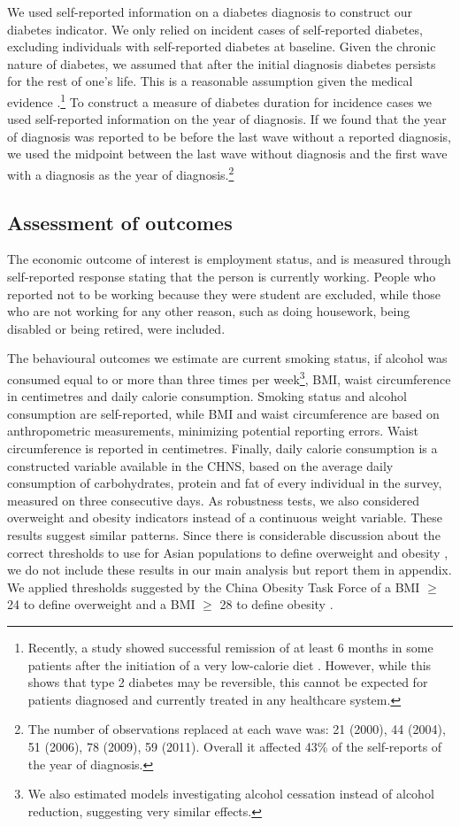 We used self-reported information on a diabetes diagnosis to construct our diabetes indicator. We only relied on incident cases of self-reported diabetes, excluding individuals with self-reported diabetes at baseline. Given the chronic nature of diabetes, we assumed that after the initial diagnosis diabetes persists for the rest of one's life. This is a reasonable assumption given the medical evidence \parencite{Steven2016}.\footnote{Recently, a study showed successful remission of at least 6 months in some patients after the initiation of a very low-calorie diet \parencite{Steven2016}. However, while this shows that type 2 diabetes may be reversible, this cannot be expected for patients diagnosed and currently treated in any healthcare system.} To construct a measure of diabetes duration for incidence cases we used self-reported information on the year of diagnosis. If we found that the year of diagnosis was reported to be before the last wave without a reported diagnosis, we used the midpoint between the last wave without diagnosis and the first wave with a diagnosis as the year of diagnosis.\footnote{The number of observations replaced at each wave was: 21 (2000), 44 (2004), 51  (2006), 78 (2009), 59 (2011). Overall it affected 43\% of the self-reports of the year of diagnosis.}

\subsection{Assessment of outcomes}

The economic outcome of interest is employment status, and is measured through self-reported response stating that the person is currently working. People who reported not to be working because they were student are excluded, while those who are not working for any other reason, such as doing housework, being disabled or being retired, were included. 

The behavioural outcomes we estimate are current smoking status, if alcohol was consumed equal to or more than three times per week\footnote{We also estimated models investigating alcohol cessation instead of alcohol reduction, suggesting very similar effects.}, \ac{BMI}, waist circumference in centimetres and daily calorie consumption. Smoking status and alcohol consumption are self-reported, while \ac{BMI} and waist circumference are based on anthropometric measurements, minimizing potential reporting errors. Waist circumference is reported in centimetres. Finally, daily calorie consumption is a constructed variable available in the \ac{CHNS}, based on the average daily consumption of carbohydrates, protein and fat of every individual in the survey, measured on three consecutive days. As robustness tests, we also considered overweight and obesity indicators instead of a continuous weight variable. These results suggest similar patterns. Since there is considerable discussion about the correct thresholds to use for Asian populations to define overweight and obesity \parencite{WHO2004,He2015,Zeng2014a}, we do not include these results in our main analysis but report them in appendix. We applied thresholds suggested by the China Obesity Task Force of a \ac{BMI} $\geq$ 24 to define overweight and a \ac{BMI} $\geq$ 28 to define obesity \parencite{group2004body}.


